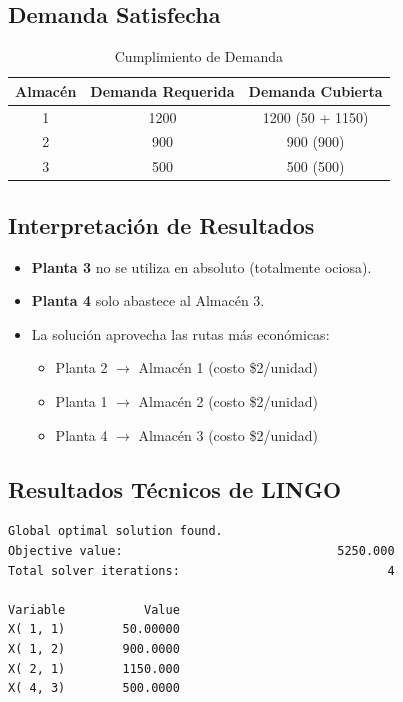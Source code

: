 \documentclass[12pt, a4paper, oneside]{book}
\theoremstyle{definition}
\begin{document}
\subsection{Demanda Satisfecha}
\begin{table}[h]
\centering
\caption{Cumplimiento de Demanda}
\begin{tabular}{|c|c|c|}
\hline
\textbf{Almacén} & \textbf{Demanda Requerida} & \textbf{Demanda Cubierta} \\ \hline
1 & 1200 & 1200 (50 + 1150) \\ \hline
2 & 900 & 900 (900) \\ \hline
3 & 500 & 500 (500) \\ \hline
\end{tabular}
\end{table}

\subsection{Interpretación de Resultados}
\begin{itemize}
\item \textbf{Planta 3} no se utiliza en absoluto (totalmente ociosa).
\item \textbf{Planta 4} solo abastece al Almacén 3.
\item La solución aprovecha las rutas más económicas:
  \begin{itemize}
  \item Planta 2 $\rightarrow$ Almacén 1 (costo \$2/unidad)
  \item Planta 1 $\rightarrow$ Almacén 2 (costo \$2/unidad)
  \item Planta 4 $\rightarrow$ Almacén 3 (costo \$2/unidad)
  \end{itemize}
\end{itemize}

\subsection{Resultados Técnicos de LINGO}

\begin{lstlisting}[caption=Parte relevante del output de LINGO]
Global optimal solution found.
Objective value:                              5250.000
Total solver iterations:                             4

Variable           Value
X( 1, 1)        50.00000
X( 1, 2)        900.0000
X( 2, 1)        1150.000
X( 4, 3)        500.0000
\end{lstlisting}
\end{document}
